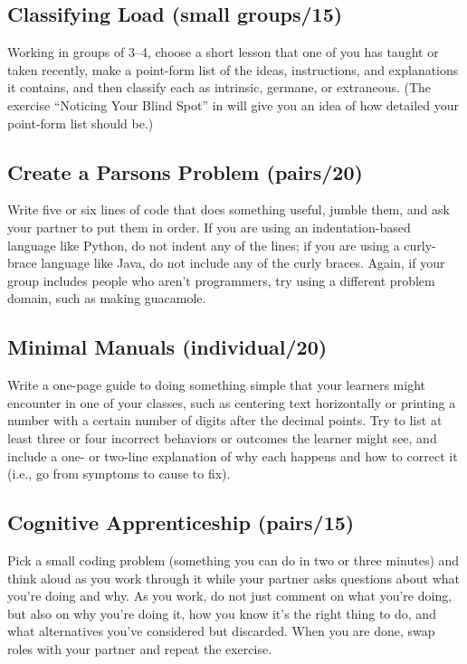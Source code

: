 \subsection*{Classifying Load (small groups/15)}

Working in groups of 3--4, choose a short lesson that one of you has
taught or taken recently, make a point-form list of the ideas,
instructions, and explanations it contains, and then classify each as
intrinsic, germane, or extraneous. (The exercise ``Noticing Your Blind
Spot'' in  will give you an idea of how
detailed your point-form list should be.)

\subsection*{Create a Parsons Problem (pairs/20)}

Write five or six lines of code that does something useful, jumble them,
and ask your partner to put them in order. If you are using an
indentation-based language like Python, do not indent any of the lines;
if you are using a curly-brace language like Java, do not include any of
the curly braces. Again, if your group includes people who aren't
programmers, try using a different problem domain, such as making
guacamole.

\subsection*{Minimal Manuals (individual/20)}

Write a one-page guide to doing something simple that your learners
might encounter in one of your classes, such as centering text
horizontally or printing a number with a certain number of digits after
the decimal points. Try to list at least three or four incorrect
behaviors or outcomes the learner might see, and include a one- or
two-line explanation of why each happens and how to correct it (i.e., go
from symptoms to cause to fix).

\subsection*{Cognitive Apprenticeship (pairs/15)}

Pick a small coding problem (something you can do in two or three
minutes) and think aloud as you work through it while your partner asks
questions about what you're doing and why. As you work, do not just
comment on what you're doing, but also on why you're doing it, how you
know it's the right thing to do, and what alternatives you've considered
but discarded. When you are done, swap roles with your partner and
repeat the exercise.

